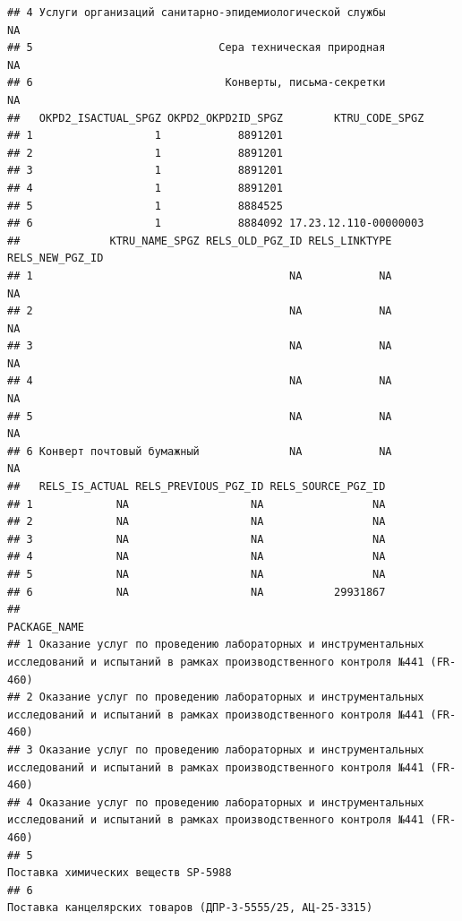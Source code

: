 \documentclass[
]{article}
\begin{document}
\begin{verbatim}
## 4 Услуги организаций санитарно-эпидемиологической службы                    NA
## 5                             Сера техническая природная                    NA
## 6                              Конверты, письма-секретки                    NA
##   OKPD2_ISACTUAL_SPGZ OKPD2_OKPD2ID_SPGZ        KTRU_CODE_SPGZ
## 1                   1            8891201                      
## 2                   1            8891201                      
## 3                   1            8891201                      
## 4                   1            8891201                      
## 5                   1            8884525                      
## 6                   1            8884092 17.23.12.110-00000003
##              KTRU_NAME_SPGZ RELS_OLD_PGZ_ID RELS_LINKTYPE RELS_NEW_PGZ_ID
## 1                                        NA            NA              NA
## 2                                        NA            NA              NA
## 3                                        NA            NA              NA
## 4                                        NA            NA              NA
## 5                                        NA            NA              NA
## 6 Конверт почтовый бумажный              NA            NA              NA
##   RELS_IS_ACTUAL RELS_PREVIOUS_PGZ_ID RELS_SOURCE_PGZ_ID
## 1             NA                   NA                 NA
## 2             NA                   NA                 NA
## 3             NA                   NA                 NA
## 4             NA                   NA                 NA
## 5             NA                   NA                 NA
## 6             NA                   NA           29931867
##                                                                                                                              PACKAGE_NAME
## 1 Оказание услуг по проведению лабораторных и инструментальных исследований и испытаний в рамках производственного контроля №441 (FR-460)
## 2 Оказание услуг по проведению лабораторных и инструментальных исследований и испытаний в рамках производственного контроля №441 (FR-460)
## 3 Оказание услуг по проведению лабораторных и инструментальных исследований и испытаний в рамках производственного контроля №441 (FR-460)
## 4 Оказание услуг по проведению лабораторных и инструментальных исследований и испытаний в рамках производственного контроля №441 (FR-460)
## 5                                                                                                     Поставка химических веществ SP-5988
## 6                                                                              Поставка канцелярских товаров (ДПР-3-5555/25, АЦ-25-3315) 

\end{verbatim}
\end{document}
